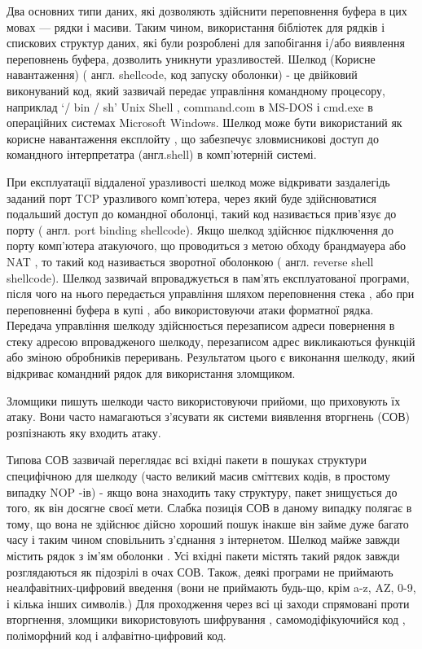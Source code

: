 
Два основних типи даних, які дозволяють здійснити переповнення буфера в цих мовах — рядки і масиви. Таким чином, використання бібліотек для рядків і спискових структур даних, які були розроблені для запобігання і/або виявлення переповнень буфера, дозволить уникнути уразливостей.
Шелкод (Корисне навантаження) ( англ. shellcode, код запуску оболонки) - це двійковий виконуваний код, який зазвичай передає управління командному процесору,  наприклад `/ bin / sh'  Unix Shell , command.com в MS-DOS і cmd.exe в операційних системах Microsoft Windows.  Шелкод може бути використаний як корисне навантаження експлойту , що забезпечує зловмисникові доступ до командного інтерпретатра (англ.shell) в комп'ютерній системі.

При експлуатації віддаленої уразливості шелкод може відкривати заздалегідь заданий порт TCP уразливого комп'ютера, через який буде здійснюватися подальший доступ до командної оболонці, такий код називається прив'язує до порту ( англ. port binding shellcode).  Якщо шелкод здійснює підключення до порту комп'ютера атакуючого, що проводиться з метою обходу брандмауера або NAT , то такий код називається зворотної оболонкою ( англ. reverse shell shellcode).
Шелкод зазвичай впроваджується в пам'ять експлуатованої програми, після чого на нього передається управління шляхом переповнення стека , або при переповненні буфера в купі , або використовуючи атаки форматної рядка.  Передача управління шелкоду здійснюється перезаписом адреси повернення в стеку адресою впровадженого шелкоду, перезаписом адрес викликаються функцій або зміною обробників переривань.  Результатом цього є виконання шелкоду, який відкриває командний рядок для використання зломщиком.

Зломщики пишуть шелкоди часто використовуючи прийоми, що приховують їх атаку.  Вони часто намагаються з'ясувати як системи виявлення вторгнень (СОВ) розпізнають яку входить атаку.  

Типова СОВ зазвичай переглядає всі вхідні пакети в пошуках структури специфічною для шелкоду (часто великий масив сміттєвих кодів, в простому випадку NOP -ів) -  якщо вона знаходить таку структуру, пакет знищується до того, як він досягне своєї мети.  Слабка позиція СОВ в даному випадку полягає в тому, що вона не здійснює дійсно хороший пошук інакше він займе дуже багато часу і таким чином сповільнить з'єднання з інтернетом. 
Шелкод майже завжди містить рядок з ім'ям оболонки .  Усі вхідні пакети містять такий рядок завжди розглядаються як підозрілі в очах СОВ.  Також, деякі програми не приймають неалфавітних-цифровий введення (вони не приймають будь-що, крім a-z, AZ, 0-9, і кілька інших символів.)
Для проходження через всі ці заходи спрямовані проти вторгнення, зломщики використовують шифрування , самомодіфікуючийся код , поліморфний код і алфавітно-цифровий код.

